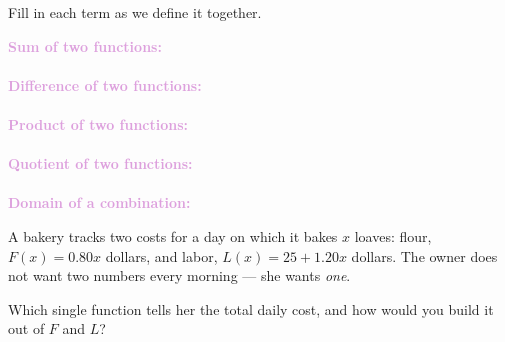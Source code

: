 \documentclass[10pt]{article}
\begin{document}

\vspace{0.12in}

\boxguard
\begin{vocabbox}
Fill in each term as we define it together.
\par\vspace{2pt}
\noindent\textbf{\textcolor{plum}{Sum of two functions:}}\\[1pt]
\writeline\\[3pt]
\noindent\textbf{\textcolor{plum}{Difference of two functions:}}\\[1pt]
\writeline\\[3pt]
\noindent\textbf{\textcolor{plum}{Product of two functions:}}\\[1pt]
\writeline\\[3pt]
\noindent\textbf{\textcolor{plum}{Quotient of two functions:}}\\[1pt]
\writeline\\[3pt]
\noindent\textbf{\textcolor{plum}{Domain of a combination:}}\\[1pt]
\writeline
\end{vocabbox}

\vspace{0.1in}

\boxguard
\begin{hookbox}
A bakery tracks two costs for a day on which it bakes $x$ loaves: flour,
$F(x) = 0.80x$ dollars, and labor, $L(x) = 25 + 1.20x$ dollars. The owner does
not want two numbers every morning --- she wants \emph{one}.

Which single function tells her the total daily cost, and how would you build it
out of $F$ and $L$?
\end{hookbox}
\end{document}
